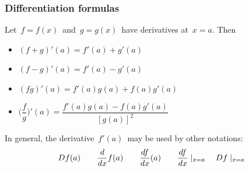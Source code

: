 











 \begin{frame}[fragile] \frametitle{Differentiation formulas}
Let\ $f=f(x)$\ and\ $g=g(x)$\ have derivatives at\ $x=a$. Then
\begin{itemize}
	\item $(f+g)'(a) = f'(a) + g'(a)$\\
	\item $(f-g)'(a) = f'(a) - g'(a)$\\
	\item $(fg)'(a) = f'(a)g(a) + f(a)g'(a)$\\
	\item$\big( \dfrac{f}{g} \big)'(a) = \dfrac{f'(a)g(a) - f(a)g'(a)}{[g(a)]^2}$
\end{itemize}

In general, the derivative\ $f'(a)$\  may be used by other notations:
\[ D f(a) \qquad \frac{d {} }{d x} f(a) \qquad \frac{d {f} }{d x}(a) \qquad \frac{d {f} }{d x} \mid_{x=a} \quad D f \mid_{x=a} \]


\end{frame}

